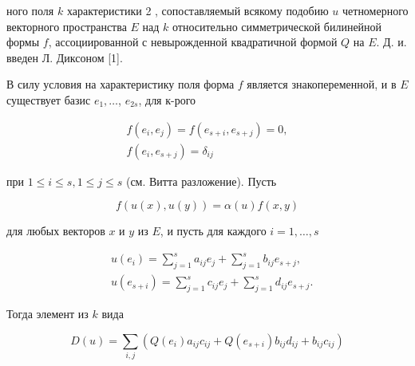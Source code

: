 \documentclass[10pt]{article}
\begin{document}
ного поля $k$ характеристики 2 , сопоставляемый всякому подобию $u$ четномерного векторного пространства $E$ над $k$ относительно симметрической билинейной формы $f$, ассоциированной с невырожденной квадратичной формой $Q$ на $E$. Д. и. введен Л. Диксоном [1].



В силу условия на характеристику поля форма $f$ является знакопеременной, и в $E$ существует базис $e_{1}, \ldots$, $e_{2 s}$, для к-рого



\[

\begin{gathered}

f\left(e_{i}, e_{j}\right)=f\left(e_{s+i}, e_{s+j}\right)=0, \\

f\left(e_{i}, e_{s+j}\right)=\delta_{i j}

\end{gathered}

\]



при $1 \leqslant i \leqslant s, 1 \leqslant j \leqslant s$ (см. Витта разложение). Пусть



\[

f(u(x), u(y))=\alpha(u) f(x, y)

\]



для любых векторов $x$ и $y$ из $E$, и пусть для каждого $i=1, \ldots, s$



\[

\begin{aligned}

& u\left(e_{i}\right)=\sum_{j=1}^{s} a_{i j} e_{j}+\sum_{j=1}^{s} b_{i j} e_{s+j}, \\

& u\left(e_{s+i}\right)=\sum_{j=1}^{s} c_{i j} e_{j}+\sum_{j=1}^{s} d_{i j} e_{s+j} .

\end{aligned}

\]



Тогда элемент из $k$ вида



\[

D(u)=\sum_{i, j}\left(Q\left(e_{i}\right) a_{i j} c_{i j}+Q\left(e_{s+i}\right) b_{i j} d_{i j}+b_{i j} c_{i j}\right)

\]
\end{document}
